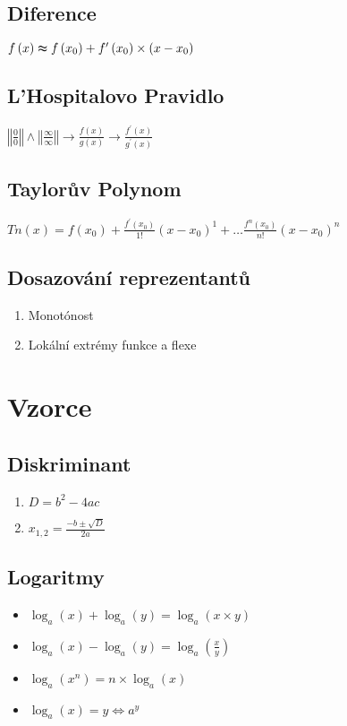 \documentclass{article}
\begin{document}
\begin{multicols}{2}
\subsection{Diference}
$f\left(x\right)\thickapprox f\left(x_{0}\right)+f^{\prime}\left(x_{0}\right)\times\left(x-x_{0}\right)$
\subsection{L'Hospitalovo Pravidlo}
$\left\Vert \frac{0}{0}\right\Vert \wedge\left\Vert \frac{\infty}{\infty}\right\Vert \rightarrow\frac{f\left(x\right)}{g\left(x\right)}\rightarrow\frac{f^{\prime}\left(x\right)}{g^{\prime}\left(x\right)}$
\subsection{Taylorův Polynom}
$Tn\left(x\right)=f\left(x_{0}\right)+\frac{f^{\prime}\left(x_{0}\right)}{1!}\left(x-x_{0}\right)^{1}+\ldots\frac{f^{n}\left(x_{0}\right)}{n!}\left(x-x_{0}\right)^{n}$
\subsection{Dosazování reprezentantů}
\begin{enumerate}
    \item Monotónost
    \item Lokální extrémy funkce a flexe
\end{enumerate}
\section{Vzorce}
\subsection{Diskriminant}
\begin{enumerate}
    \item $D=b^{2}-4ac$
    \item $x_{1,2}=\frac{-b\pm\sqrt{D}}{2a}$
\end{enumerate}
\subsection{Logaritmy}
\begin{itemize}
    \item $\log_{a}\left(x\right)+\log_{a}\left(y\right)=\log_{a}\left(x\times y\right)$
    \item $\log_{a}\left(x\right)-\log_{a}\left(y\right)=\log_{a}\left(\frac{x}{y}\right)$
    \item $\log_{a}\left(x^{n}\right)=n\times\log_{a}\left(x\right)$
    \item $\log_{a}\left(x\right)=y\Leftrightarrow a^{y}$
\end{itemize}

\end{multicols}
\end{document}
